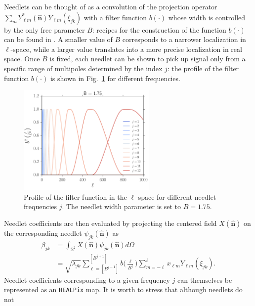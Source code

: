 \documentclass[a4paper,11pt]{article}
\newcommand{\nver}{\hat{\mathbf{n}}}
\begin{document}
Needlets can be thought of as a convolution of the projection operator $\sum_m Y^*_{\ell m}(\nver)Y_{\ell m}(\xi_{jk})$ with a filter function $b(\cdot)$ whose width is controlled by the only free parameter $B$: recipes for the construction of the function $b(\cdot)$ can be found in \cite{Marinucci2007,McEwen2013,Marinucci2011}. A smaller value of $B$ corresponds to a narrower localization in $\ell$-space, while a larger value translates into a more precise localization in real space. Once $B$ is fixed, each needlet can be shown to pick up signal only from a specific range of multipoles determined by the index $j$: the profile of the filter function $b(\cdot)$ is shown in Fig.~\ref{fig:b_need} for different frequencies.
\begin{figure}[tbp]
\centering %
\includegraphics[width=0.6\textwidth]{images/b_need.pdf}
\caption{\label{fig:b_need} Profile of the filter function in the $\ell$-space for different needlet frequencies $j$. The needlet width parameter is set to $B=1.75$.}
\end{figure}
%
Needlet coefficients are then evaluated by projecting the centered field $X(\nver)$ on the corresponding needlet $\psi_{jk}(\nver)$ as
%
\begin{equation}
\label{eqn:needcoef}
\begin{split}
\beta_{jk} &= \int_{\mathbb{S}^2} X(\nver)\psi_{jk}(\nver)d\Omega\\
&= \sqrt{\lambda_{jk}} \sum_{\ell=[B^{j-1}]}^{[B^{j+1}]} b\biggl(\frac{\ell}{B^{j}}\biggr)\sum_{m=-\ell}^{\ell}x_{\ell m}Y_{\ell m}(\xi_{jk}).
\end{split}
\end{equation}
%
Needlet coefficients corresponding to a given frequency $j$ can themselves be represented as an 
\texttt{HEALPix} map. It is worth to stress that although needlets do not
\end{document}
